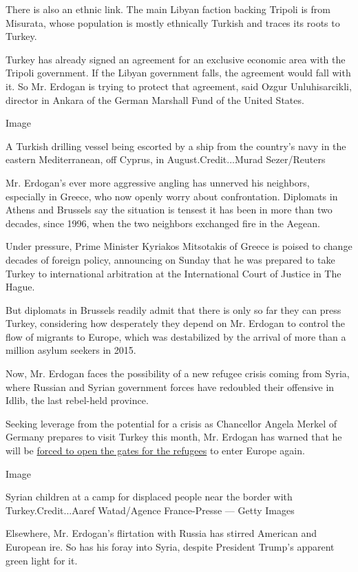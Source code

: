 There is also an ethnic link. The main Libyan faction backing Tripoli is
from Misurata, whose population is mostly ethnically Turkish and traces
its roots to Turkey.

Turkey has already signed an agreement for an exclusive economic area
with the Tripoli government. If the Libyan government falls, the
agreement would fall with it. So Mr. Erdogan is trying to protect that
agreement, said Ozgur Unluhisarcikli, director in Ankara of the German
Marshall Fund of the United States.

Image

A Turkish drilling vessel being escorted by a ship from the country's
navy in the eastern Mediterranean, off Cyprus, in August.Credit...Murad
Sezer/Reuters

Mr. Erdogan's ever more aggressive angling has unnerved his neighbors,
especially in Greece, who now openly worry about confrontation.
Diplomats in Athens and Brussels say the situation is tensest it has
been in more than two decades, since 1996, when the two neighbors
exchanged fire in the Aegean.

Under pressure, Prime Minister Kyriakos Mitsotakis of Greece is poised
to change decades of foreign policy, announcing on Sunday that he was
prepared to take Turkey to international arbitration at the
International Court of Justice in The Hague.

But diplomats in Brussels readily admit that there is only so far they
can press Turkey, considering how desperately they depend on Mr. Erdogan
to control the flow of migrants to Europe, which was destabilized by the
arrival of more than a million asylum seekers in 2015.

Now, Mr. Erdogan faces the possibility of a new refugee crisis coming
from Syria, where Russian and Syrian government forces have redoubled
their offensive in Idlib, the last rebel-held province.

Seeking leverage from the potential for a crisis as Chancellor Angela
Merkel of Germany prepares to visit Turkey this month, Mr. Erdogan has
warned that he will be
\href{https://www.nytimes.com/2019/12/23/world/middleeast/syria-idlib-russia-aid-refugees.html}{forced
to open the gates for the refugees} to enter Europe again.

Image

Syrian children at a camp for displaced people near the border with
Turkey.Credit...Aaref Watad/Agence France-Presse --- Getty Images

Elsewhere, Mr. Erdogan's flirtation with Russia has stirred American and
European ire. So has his foray into Syria, despite President Trump's
apparent green light for it.

